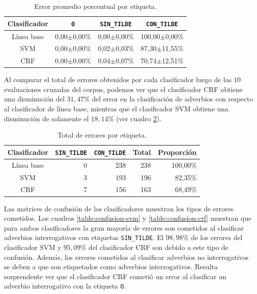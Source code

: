 \documentclass[runningheads,a4paper]{llncs}
\begin{document}
\begin{table}[ht]
 	\renewcommand{\arraystretch}{1.3}
	\renewcommand{\tabcolsep}{3pt}
	\caption{Error promedio porcentual por etiqueta.}
	\label{table:evaluacion-promedio}
	\centering
	\begin{tabular}{c r r r}
		\hline\hline
		\multicolumn{1}{c}{\textbf{Clasificador}} 
			& \multicolumn{1}{c}{\textbf{\texttt{O}}}
			& \multicolumn{1}{c}{\textbf{\texttt{SIN\_TILDE}}}
			& \multicolumn{1}{c}{\textbf{\texttt{CON\_TILDE}}} \\
		\hline
		Línea base & 0,00$\pm$0,00\% & 0,00$\pm$0,00\% & 100,00$\pm$0,00\% \\
		SVM        & 0,00$\pm$0,00\% & 0,02$\pm$0,03\% &  87,30$\pm$11,55\% \\
		CRF        & 0,00$\pm$0,00\% & 0,04$\pm$0,07\% &  70,74$\pm$12,51\% \\
		\hline
	\end{tabular}
\end{table}

Al comparar el total de errores obtenidos por cada clasificador luego de las $10$ evaluaciones cruzadas del corpus, podemos ver que el clasificador CRF obtiene una disminución del $31,47\%$ del error en la clasificación de adverbios con respecto al clasificador de línea base, mientras que el clasificador SVM obtiene una disminución de solamente el $18,14\%$ (ver cuadro \ref{table:evaluacion-total}).

\begin{table}[ht]
 	\renewcommand{\arraystretch}{1.3}
	\renewcommand{\tabcolsep}{3pt}
	\caption{Total de errores por etiqueta.}
	\label{table:evaluacion-total}
	\centering
	\begin{tabular}{c r r r r}
		\hline\hline
		\multicolumn{1}{c}{\textbf{Clasificador}} 
			& \multicolumn{1}{c}{\textbf{\texttt{SIN\_TILDE}}}
			& \multicolumn{1}{c}{\textbf{\texttt{CON\_TILDE}}} 
			& \multicolumn{1}{c}{\textbf{Total}} 
			& \multicolumn{1}{c}{\textbf{Proporci\'on}} \\
		\hline
		Línea base 	& 0 & 238 & 238 & 100,00\% \\
		SVM 		& 3 & 193 & 196 &  82,35\% \\
		CRF 		& 7 & 156 & 163 &  68,49\% \\
		\hline
	\end{tabular}
\end{table}

Las matrices de confusi\'on de los clasificadores muestran los tipos de errores cometidos. Los cuadros \ref{table:confusion-svm} y \ref{table:confusion-crf} muestran que para ambos clasificadores la gran mayor\'ia de errores son cometidos al clasificar adverbios interrogativos con etiquetas \texttt{\small SIN\_TILDE}. El $98,98\%$ de los errores del clasificador SVM y $95,09\%$ del clasificador CRF son debido a este tipo de confusi\'on. Además, los errores cometidos al clasificar adverbios no interrogativos se deben a que son etiquetados como adverbios interrogativos. Resulta sorprendente ver que el clasificador CRF cometió un error al clasificar un adverbio interrogativo con la etiqueta \texttt{\small O}.
\end{document}

